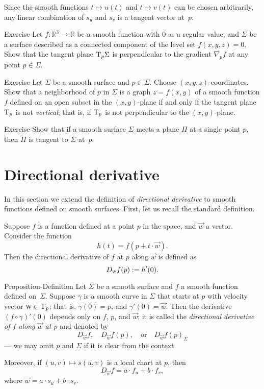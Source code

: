 Since the smooth functions $t\mapsto u(t)$ and $t\mapsto v(t)$ can be chosen arbitrarily, any linear combination of $s_u$ and $s_v$ is a tangent vector at~$p$. 
\qeds


\begin{thm}{Exercise}\label{ex:tangent-normal}
Let $f:\mathbb{R}^3\to\mathbb{R}$ be a smooth function with $0$ as a regular value, and $\Sigma$ be a surface described as a connected component of the level set $f(x,y,z)=0$.
Show that the tangent plane $\mathrm{T}_p\Sigma$ is perpendicular to the gradient $\nabla_pf$ at any point $p\in\Sigma$.
\end{thm}

\begin{thm}{Exercise}\label{ex:vertical-tangent}
Let $\Sigma$ be a smooth surface and $p\in\Sigma$.
Choose $(x,y,z)$-coordinates.
Show that a neighborhood of $p$ in $\Sigma$ is a graph $z=f(x,y)$ of a smooth function $f$ defined on an open subset in the $(x,y)$-plane if and only if the tangent plane $\mathrm{T}_p$ is not {}\emph{vertical}; that is, if $\mathrm{T}_p$ is not perpendicular to the $(x,y)$-plane.
\end{thm}

\begin{thm}{Exercise}\label{ex:tangent-single-point}
Show that if a smooth surface $\Sigma$ meets a plane $\Pi$ at a single point $p$, then $\Pi$ is tangent to $\Sigma$ at~$p$.
\end{thm}


\section{Directional derivative}\label{sec:dirder}

In this section we extend the definition of {}\emph{directional derivative} to smooth functions defined on smooth surfaces.
First, let us recall the standard definition.

Suppose $f$ is a function defined at a point $p$ in the space, and $\vec w$ a vector.
Consider the function
\[h(t)=f(p+t\cdot\vec w).\]
Then the directional derivative of $f$ at $p$ along $\vec w$ is defined as 
\[D_{\text{\sc{w}}}f(p)\mathrel{:=} h'(0).\]

\begin{thm}{Proposition-Definition}\label{def:directional-derivative}
Let $\Sigma$ be a smooth surface and $f$ a smooth function defined on~$\Sigma$.
Suppose $\gamma$ is a smooth curve in $\Sigma$ that starts at $p$ with velocity vector $\text{\sc{w}}\in \mathrm{T}_p$;
that is, $\gamma(0)=p$, and $\gamma'(0)=\vec{w}$.
Then the derivative $(f\circ\gamma)'(0)$
depends only on $f$, $p$, and $\vec{w}$;
it is called the \emph{directional derivative of $f$ along $\vec{w}$ at $p$}
and denoted by
\[D_{\vec{w}}f,\quad D_{\vec{w}}f(p), \quad\text{or}\quad D_{\vec{w}}f(p)_\Sigma\] 
--- we may omit $p$ and $\Sigma$ if it is clear from the context.

Moreover, if $(u,v)\mapsto s(u,v)$ is a local chart at $p$, then 
\[D_{\vec{w}}f=a\cdot f_u+b\cdot f_v,\]
where $\vec{w}=a\cdot s_u +b\cdot s_v$. 
\end{thm}

